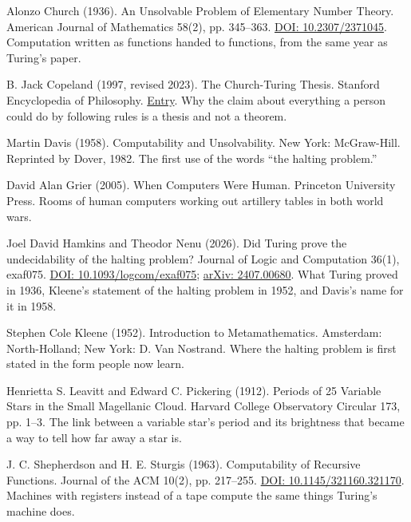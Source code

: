\documentclass[11pt,twoside]{article}
\theoremstyle{thielethm}
\theoremstyle{thieledef}
\theoremstyle{thieledef}
\theoremstyle{thieledef}
\theoremstyle{thielethm}
\theoremstyle{thieleobs}
\theoremstyle{thielethm}
\begin{document}
\noindent Alonzo Church (1936). An Unsolvable Problem of Elementary Number Theory. American Journal of Mathematics 58(2), pp. 345--363. \href{https://doi.org/10.2307/2371045}{DOI: 10.2307/2371045}. Computation written as functions handed to functions, from the same year as Turing's paper.
\par\medskip

\noindent B. Jack Copeland (1997, revised 2023). The Church-Turing Thesis. Stanford Encyclopedia of Philosophy. \href{https://plato.stanford.edu/entries/church-turing/}{Entry}. Why the claim about everything a person could do by following rules is a thesis and not a theorem.
\par\medskip

\noindent Martin Davis (1958). Computability and Unsolvability. New York: McGraw-Hill. Reprinted by Dover, 1982. The first use of the words ``the halting problem.''
\par\medskip

\noindent David Alan Grier (2005). When Computers Were Human. Princeton University Press. Rooms of human computers working out artillery tables in both world wars.
\par\medskip

\noindent Joel David Hamkins and Theodor Nenu (2026). Did Turing prove the undecidability of the halting problem? Journal of Logic and Computation 36(1), exaf075. \href{https://doi.org/10.1093/logcom/exaf075}{DOI: 10.1093/logcom/exaf075}; \href{https://arxiv.org/abs/2407.00680}{arXiv: 2407.00680}. What Turing proved in 1936, Kleene's statement of the halting problem in 1952, and Davis's name for it in 1958.
\par\medskip

\noindent Stephen Cole Kleene (1952). Introduction to Metamathematics. Amsterdam: North-Holland; New York: D. Van Nostrand. Where the halting problem is first stated in the form people now learn.
\par\medskip

\noindent Henrietta S. Leavitt and Edward C. Pickering (1912). Periods of 25 Variable Stars in the Small Magellanic Cloud. Harvard College Observatory Circular 173, pp. 1--3. The link between a variable star's period and its brightness that became a way to tell how far away a star is.
\par\medskip

\noindent J. C. Shepherdson and H. E. Sturgis (1963). Computability of Recursive Functions. Journal of the ACM 10(2), pp. 217--255. \href{https://doi.org/10.1145/321160.321170}{DOI: 10.1145/321160.321170}. Machines with registers instead of a tape compute the same things Turing's machine does.
\par\medskip
\end{document}

